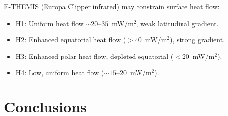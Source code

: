 \documentclass[11pt,letterpaper]{article}
\begin{document}
\begin{predictionbox}
E-THEMIS (Europa Clipper infrared) may constrain surface heat flow:
\begin{itemize}[nosep]
  \item H1: Uniform heat flow $\sim 20$--$35$~mW/m$^2$, weak latitudinal gradient.
  \item H2: Enhanced equatorial heat flow ($> 40$~mW/m$^2$), strong gradient.
  \item H3: Enhanced polar heat flow, depleted equatorial ($< 20$~mW/m$^2$).
  \item H4: Low, uniform heat flow ($\sim 15$--$20$~mW/m$^2$).
\end{itemize}
\end{predictionbox}


\section{Conclusions}
\label{sec:conclusions}
\end{document}
